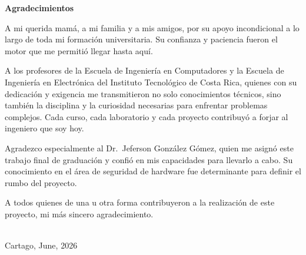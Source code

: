 
\thispagestyle{empty}
\cleardoublepage

\begin{center}
  \vspace*{1.5cm}
  {\Huge\bfseries Agradecimientos}
\end{center}

\vspace{1.5cm}

A mi querida mamá, a mi familia y a mis amigos, por su apoyo incondicional a lo
largo de toda mi formación universitaria. Su confianza y paciencia fueron el
motor que me permitió llegar hasta aquí.

A los profesores de la Escuela de Ingeniería en Computadores y la Escuela de
Ingeniería en Electrónica del Instituto Tecnológico de Costa Rica, quienes con
su dedicación y exigencia me transmitieron no solo conocimientos técnicos, sino
también la disciplina y la curiosidad necesarias para enfrentar problemas
complejos. Cada curso, cada laboratorio y cada proyecto contribuyó a forjar al
ingeniero que soy hoy.

Agradezco especialmente al Dr.\ Jeferson González Gómez, quien me asignó este
trabajo final de graduación y confió en mis capacidades para llevarlo a cabo. Su
conocimiento en el área de seguridad de hardware fue
determinante para definir el rumbo del proyecto. 

A todos quienes de una u otra forma contribuyeron a la realización de este
proyecto, mi más sincero agradecimiento.

\vspace*{\fill}

\begin{flushright}
\scriptAuthor\\[1mm]
Cartago, June, 2026
\end{flushright}

\cleardoublepage

